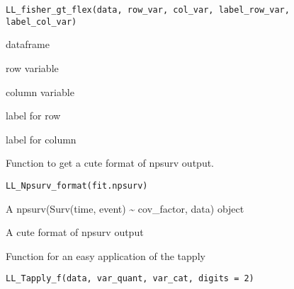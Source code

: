 \documentclass[a4paper]{book}
\begin{document}
%
\begin{Usage}
\begin{verbatim}
LL_fisher_gt_flex(data, row_var, col_var, label_row_var, label_col_var)
\end{verbatim}
\end{Usage}
%
\begin{Arguments}
\begin{ldescription}
\item[\code{data}] dataframe

\item[\code{row\_var}] row variable

\item[\code{col\_var}] column variable

\item[\code{label\_row\_var}] label for row

\item[\code{label\_col\_var}] label for column
\end{ldescription}
\end{Arguments}
%
\begin{Description}
Function to get a cute format of npsurv output.
\end{Description}
%
\begin{Usage}
\begin{verbatim}
LL_Npsurv_format(fit.npsurv)
\end{verbatim}
\end{Usage}
%
\begin{Arguments}
\begin{ldescription}
\item[\code{fit.npsurv}] A npsurv(Surv(time, event) \textasciitilde{} cov\_factor, data) object
\end{ldescription}
\end{Arguments}
%
\begin{Value}
A cute format of npsurv output
\end{Value}
%
\begin{Description}
Function for an easy application of the tapply
\end{Description}
%
\begin{Usage}
\begin{verbatim}
LL_Tapply_f(data, var_quant, var_cat, digits = 2)
\end{verbatim}
\end{Usage}
\end{document}

